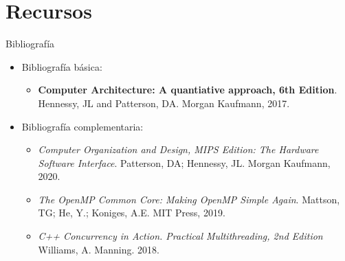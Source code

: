 \section{Recursos}

\begin{frame}[t]{Bibliografía}
\begin{itemize}
  \item Bibliografía básica:
    \begin{itemize}
      \item \textbf{Computer Architecture: A quantiative approach, 6th Edition}. 
            Hennessy, JL and Patterson, DA. 
            Morgan Kaufmann, 2017.
    \end{itemize}
  \vspace{1em}
  \pause
  \item Bibliografía complementaria:
    \begin{itemize}
      \item \emph{Computer Organization and Design, MIPS Edition: The Hardware Software Interface}. 
            Patterson, DA; Hennessy, JL. 
            Morgan Kaufmann, 2020.
      \item \emph{The OpenMP Common Core: Making OpenMP Simple Again}.
            Mattson, TG; He, Y.; Koniges, A.E.
            MIT Press, 2019. 
      \item \emph{C++ Concurrency in Action. Practical Multithreading, 2nd Edition} 
            Williams, A.  
            Manning. 2018.
    \end{itemize}
\end{itemize}
\end{frame}


